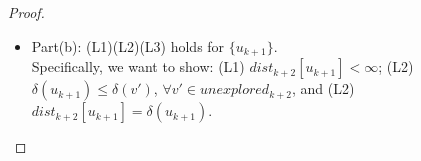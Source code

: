 \documentclass[11pt, oneside]{article}   	%
\theoremstyle{definition}
\begin{document}
\begin{proof}
\begin{itemize}
  \\\\
  \texttt{Proof of (L3)}: Since for each node $q \in explored_{k+1}$, the induction hypothesis implies that $dist_{k+1}[q] = \delta(q)$, then \texttt{Lemma 3.3} imples that $dist_{k+2}[q] = dist_{k+1}[q] = \delta(q)$. (L3) holds for $explored_{k+1}$.
  \\\\
  \texttt{Proof of (L1)}: Since the induction hypothesis implies that $\forall q \in explored_{k+1}, dist_{k+1}[q] < \infty$, and the proof of (L3) above shows that $dist_{k+2}[q] = dist_{k+1}[q]$, then $dist_{k+2}[q] < \infty$. (L1) holds for $explored_{k+1}$.
  \\\\
  Hence we have proved that both (1) and (2) holds for all nodes in $explored_{k+1}$.

  \item Part(b): (L1)(L2)(L3) holds for $\{u_{k+1}\}$. 
  \\
  Specifically, we want to show: (L1) $dist_{k+2}[u_{k+1}] < \infty$; (L2) $\delta(u_{k+1}) \leq \delta(v')$, $\forall v' \in unexplored_{k+2}$, and (L2) $dist_{k+2}[u_{k+1}] = \delta(u_{k+1})$. 



\end{itemize}
\end{proof}
\end{document}
